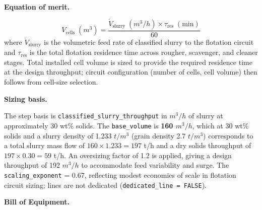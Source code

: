 \medskip
\noindent\textbf{Equation of merit.}\quad

\[
	V_\text{cells}\;(\si{m^3}) = \frac{\dot{V}_\text{slurry}\;(\si{m^3/h}) \times \tau_\text{res}\;(\text{min})}{60}
\]
where $\dot{V}_\text{slurry}$ is the volumetric feed rate of classified slurry to the flotation circuit and $\tau_\text{res}$ is the total flotation residence time across rougher, scavenger, and cleaner stages. Total installed cell volume is sized to provide the required residence time at the design throughput; circuit configuration (number of cells, cell volume) then follows from cell-size selection.


\medskip
\noindent\textbf{Sizing basis.}\quad

The step basis is \texttt{classified\_slurry\_throughput} in $\si{m^3/h}$ of slurry at approximately 30 wt\% solids. The \texttt{base\_volume} is \textbf{160 $\si{m^3/h}$}, which at 30 wt\% solids and a slurry density of 1.233 $\si{t/m^3}$ (grain density 2.7 $\si{t/m^3}$) corresponds to a total slurry mass flow of $160 \times 1.233 = 197$ t/h and a dry solids throughput of $197 \times 0.30 = 59$ t/h. An oversizing factor of 1.2 is applied, giving a design throughput of 192 $\si{m^3/h}$ to accommodate feed variability and surge. The \texttt{scaling\_exponent} = 0.67, reflecting modest economies of scale in flotation circuit sizing; lines are not dedicated (\texttt{dedicated\_line = FALSE}).


\medskip
\noindent\textbf{Bill of Equipment.}\quad

